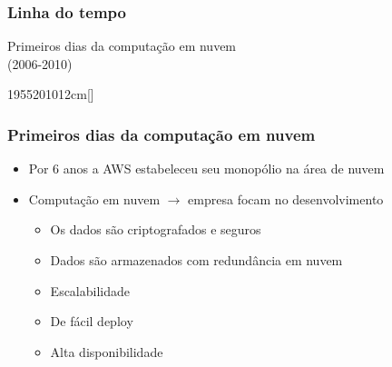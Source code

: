 \begin{frame}
	\frametitle{Linha do tempo}
	\begin{center}
		Primeiros dias da computação em nuvem \\
		(2006-2010)
	\end{center}
	\hfill
	\begin{scriptsize}
	\begin{bf}
	\begin{center}
		\begin{chronology}[10]{1955}{2010}{12cm}[\textwidth]
			\color{lightgreen}
		\end{chronology}
	\end{center}
	\end{bf}
	\end{scriptsize}
\end{frame}

\begin{frame}[allowframebreaks]
	\frametitle{Primeiros dias da computação em nuvem}
	\begin{itemize}
		\item Por 6 anos a AWS estabeleceu seu monopólio na área de nuvem
		\item Computação em nuvem $\rightarrow$ empresa focam no desenvolvimento
			\begin{itemize}
				\item Os dados são criptografados e seguros
				\item Dados são armazenados com redundância em nuvem
				\item Escalabilidade
				\item De fácil deploy
				\item Alta disponibilidade
			\end{itemize}
	\end{itemize}
\end{frame}
